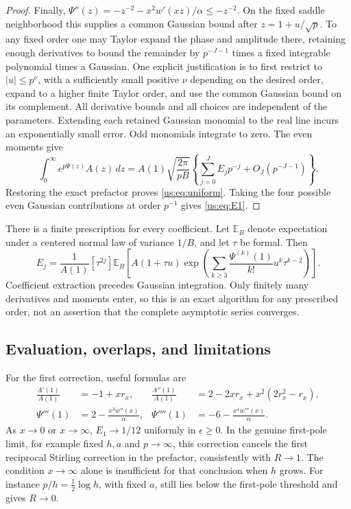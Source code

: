 \begin{proof}
Finally,
$\Psi''(z)=-z^{-2}-x^2w'(xz)/\alpha\le-z^{-2}$.
On the fixed saddle neighborhood this supplies a common Gaussian
bound after $z=1+u/\sqrt p$. To any fixed order one may Taylor
expand the phase and amplitude there, retaining enough derivatives
to bound the remainder by $p^{-J-1}$ times a fixed integrable
polynomial times a Gaussian. One explicit justification is to first
restrict to $|u|\le p^\nu$, with a sufficiently small positive
$\nu$ depending on the desired order, expand to a higher finite
Taylor order, and use the common Gaussian bound on its complement.
All derivative bounds and all choices are independent of the
parameters. Extending each retained Gaussian monomial to the real
line incurs an exponentially small error. Odd monomials integrate
to zero. The even moments give
\[
 \int_0^\infty e^{p\Psi(z)}A(z)\,dz
 =A(1)\sqrt{\frac{2\pi}{pB}}
   \left\{\sum_{j=0}^J E_jp^{-j}+O_J(p^{-J-1})\right\}.
\]
Restoring the exact prefactor proves \eqref{us:eq:uniform}.
Taking the four possible even Gaussian contributions at order
$p^{-1}$ gives \eqref{us:eq:E1}.
\end{proof}

There is a finite prescription for every coefficient. Let
$\mathbb E_B$ denote expectation under a centered normal law of
variance $1/B$, and let $\tau$ be formal. Then
\begin{equation}\label{us:eq:coefficient-recipe}
 E_j=\frac1{A(1)}[\tau^{2j}]
 \mathbb E_B\!\left[
 A(1+\tau u)
 \exp\!\left(\sum_{k\ge3}
      \frac{\Psi^{(k)}(1)}{k!}u^k\tau^{k-2}\right)\right].
\end{equation}
Coefficient extraction precedes Gaussian integration. Only finitely
many derivatives and moments enter, so this is an exact algorithm
for any prescribed order, not an assertion that the complete
asymptotic series converges.

\subsection{Evaluation, overlaps, and limitations}

For the first correction, useful formulas are
\begin{align}
 \frac{A'(1)}{A(1)}&=-1+xr_x,&
 \frac{A''(1)}{A(1)}&=2-2xr_x+x^2(2r_x^2-r_x),\label{us:eq:amplitude-derivatives}\\
 \Psi'''(1)&=2-\frac{x^3w''(x)}\alpha,&
 \Psi''''(1)&=-6-\frac{x^4w'''(x)}\alpha.
 \label{us:eq:phase-derivatives}
\end{align}
As $x\to0$ or $x\to\infty$, $E_1\to1/12$ uniformly in
$\epsilon\ge0$. In the genuine first-pole limit, for example fixed
$h,a$ and $p\to\infty$, this correction cancels the first reciprocal
Stirling correction in the prefactor, consistently with $R\to1$.
The condition $x\to\infty$ alone is insufficient for that conclusion
when $h$ grows. For instance $p/h=\tfrac12\log h$, with fixed $a$,
still lies below the first-pole threshold and gives $R\to0$.

